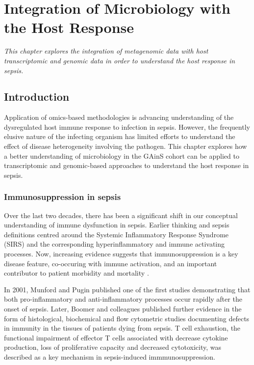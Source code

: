 \chapter{Integration of Microbiology with the Host Response}
\label{ch:Results3}
\textit{This chapter explores the integration of metagenomic data with host transcriptomic and genomic data in order to understand the host response in sepsis.}

\startcontents[chapters]{\vspace{-1.4cm}}
\singlespacing
{}
\doublespacing

\section{Introduction}
Application of omics-based methodologies is advancing understanding of the dysregulated host immune response to infection in sepsis. However, the frequently elusive nature of the infecting organism has limited efforts to understand the effect of disease heterogeneity involving the pathogen. This chapter explores how a better understanding of microbiology in the GAinS cohort can be applied to transcriptomic and genomic-based approaches to understand the host response in sepsis. 

\subsection{Immunosuppression in sepsis}
Over the last two decades, there has been a significant shift in our conceptual understanding of immune dysfunction in sepsis. Earlier thinking and sepsis definitions centred around the Systemic Inflammatory Response Syndrome (SIRS) and the corresponding hyperinflammatory and immune activating processes. Now, increasing evidence suggests that immunosuppression is a key disease feature, co-occuring with immune activation, and an important contributor to patient morbidity and mortality \parencite{Daviaud2015}. 

In 2001, Munford and Pugin \parencite{Munford2001} published one of the first studies demonstrating that both pro-inflammatory and anti-inflammatory processes occur rapidly after the onset of sepsis. Later, Boomer and colleagues \parencite{Boomer2011} published further evidence in the form of histological, biochemical and flow cytometric studies documenting defects in immunity in the tissues of patients dying from sepsis. T cell exhaustion, the functional impairment of effector T cells associated with decrease cytokine production, loss of proliferative capacity and decreased cytotoxicity, was described as a key mechanism in sepsis-induced immmunosuppression. 

